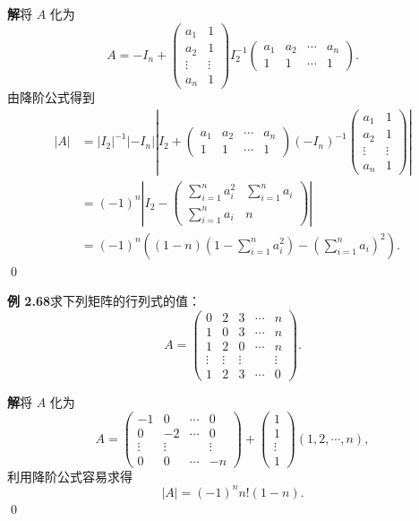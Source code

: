 \documentclass[UTF8, 12pt, fontset=fandol, oneside]{ctexart}
\begin{document}
\noindent\textbf{解}\quad 将 $A$ 化为
\[
A=-I_n+
\left(
\begin{array}{cc}
a_1 & 1\\
a_2 & 1\\
\vdots & \vdots\\
a_n & 1
\end{array}
\right)
I_2^{-1}
\left(
\begin{array}{cccc}
a_1 & a_2 & \cdots & a_n\\
1 & 1 & \cdots & 1
\end{array}
\right).
\]
由降阶公式得到
\[
\begin{aligned}
|A|
&=|I_2|^{-1}|-I_n|
\left|
I_2+
\left(
\begin{array}{cccc}
a_1 & a_2 & \cdots & a_n\\
1 & 1 & \cdots & 1
\end{array}
\right)
(-I_n)^{-1}
\left(
\begin{array}{cc}
a_1 & 1\\
a_2 & 1\\
\vdots & \vdots\\
a_n & 1
\end{array}
\right)
\right|\\
&=(-1)^n
\left|
I_2-
\left(
\begin{array}{cc}
\sum\limits_{i=1}^n a_i^2 & \sum\limits_{i=1}^n a_i\\
\sum\limits_{i=1}^n a_i & n
\end{array}
\right)
\right|\\
&=(-1)^n\left((1-n)\left(1-\sum_{i=1}^n a_i^2\right)-\left(\sum_{i=1}^n a_i\right)^2\right).
\end{aligned}
\]
\qed

\noindent\textbf{例 2.68}\quad 求下列矩阵的行列式的值：
\[
A=
\left(
\begin{array}{ccccc}
0 & 2 & 3 & \cdots & n\\
1 & 0 & 3 & \cdots & n\\
1 & 2 & 0 & \cdots & n\\
\vdots & \vdots & \vdots & & \vdots\\
1 & 2 & 3 & \cdots & 0
\end{array}
\right).
\]

\noindent\textbf{解}\quad 将 $A$ 化为
\[
A=
\left(
\begin{array}{cccc}
-1 & 0 & \cdots & 0\\
0 & -2 & \cdots & 0\\
\vdots & \vdots & & \vdots\\
0 & 0 & \cdots & -n
\end{array}
\right)
+
\left(
\begin{array}{c}
1\\
1\\
\vdots\\
1
\end{array}
\right)
(1,2,\cdots,n),
\]
利用降阶公式容易求得
\[
|A|=(-1)^n n!(1-n).
\]
\qed
\end{document}

